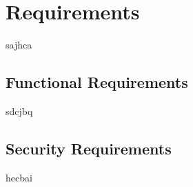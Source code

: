 \chapter{Requirements}
sajhca
\section{Functional Requirements}
sdcjbq

\section{Security Requirements}
hecbai
